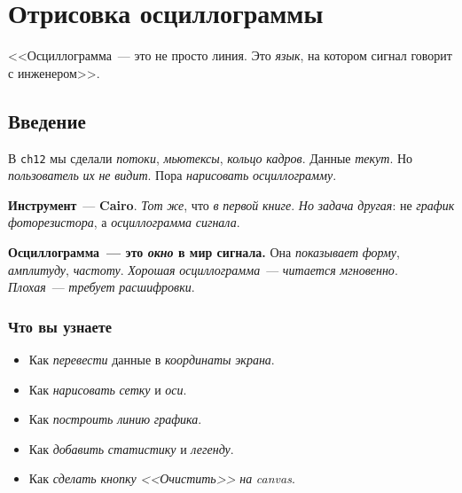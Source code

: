 
\chapter{Отрисовка осциллограммы}
\label{ch:scope-render}

\epigraph{<<Осциллограмма~--- это не просто линия. Это \emph{язык},
на котором сигнал говорит с инженером>>.}{}

\section{Введение}
\label{sec:render-intro}

В \texttt{ch12} мы сделали \emph{потоки}, \emph{мьютексы},
\emph{кольцо} \emph{кадров}. Данные \emph{текут}. Но
\emph{пользователь} \emph{их} \emph{не} \emph{видит}. Пора
\emph{нарисовать} \emph{осциллограмму}.

\textbf{Инструмент}~--- \textbf{Cairo}. \emph{Тот} \emph{же},
что \emph{в} \emph{первой} \emph{книге}. \emph{Но} \emph{задача}
\emph{другая}: не \emph{график} \emph{фоторезистора}, а
\emph{осциллограмма} \emph{сигнала}.

\begin{ideabox}
\textbf{Осциллограмма~--- это \emph{окно} в мир сигнала.}
Она \emph{показывает} \emph{форму}, \emph{амплитуду},
\emph{частоту}. \emph{Хорошая} \emph{осциллограмма}~---
\emph{читается} \emph{мгновенно}. \emph{Плохая}~---
\emph{требует} \emph{расшифровки}.
\end{ideabox}

\subsection{Что вы узнаете}

\begin{itemize}
    \item Как \emph{перевести} данные в \emph{координаты} \emph{экрана}.
    \item Как \emph{нарисовать} \emph{сетку} и \emph{оси}.
    \item Как \emph{построить} \emph{линию} \emph{графика}.
    \item Как \emph{добавить} \emph{статистику} и \emph{легенду}.
    \item Как \emph{сделать} \emph{кнопку} \emph{<<Очистить>>}
          \emph{на} \emph{canvas}.
\end{itemize}

